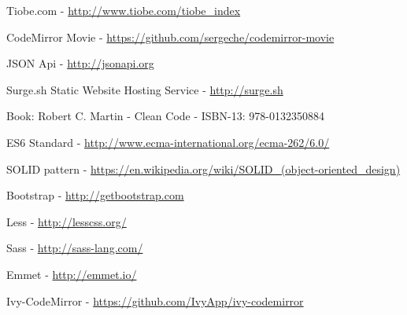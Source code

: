 \documentclass[12pt, a4paper, oneside, openright, medskipamount]{report}
\begin{document}
\begin{thebibliography}{9}

Tiobe.com - \url{http://www.tiobe.com/tiobe_index}

CodeMirror Movie - \url{https://github.com/sergeche/codemirror-movie}

JSON Api - \url{http://jsonapi.org}

Surge.sh Static Website Hosting Service - \url{http://surge.sh}

Book: Robert C. Martin - Clean Code - ISBN-13: 978-0132350884

ES6 Standard - \url{http://www.ecma-international.org/ecma-262/6.0/}

SOLID pattern - \url{https://en.wikipedia.org/wiki/SOLID_(object-oriented_design)}

Bootstrap - \url{http://getbootstrap.com}

Less - \url{http://lesscss.org/}

Sass - \url{http://sass-lang.com/}

Emmet - \url{http://emmet.io/}

Ivy-CodeMirror - \url{https://github.com/IvyApp/ivy-codemirror}

\end{thebibliography}

\end{document}
